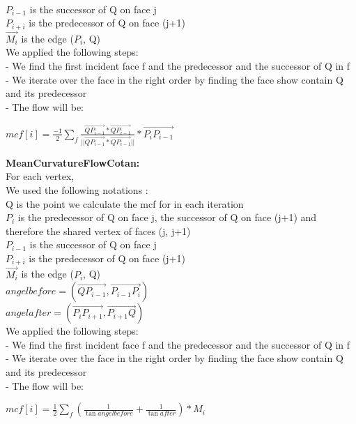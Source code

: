 \documentclass[12pt]{article}
\begin{document}
\\$P_{i-1}$ is the successor of Q on face j
\\$P_{i+i}$ is the predecessor of Q on face (j+1)
\\$\vec{M_i}$ is the edge ($P_i$, Q)
\\ We applied the following steps:
\\- We find the first incident face f and the predecessor and the successor of Q in f 
\\ - We iterate over the face in the right order by finding  the face show contain Q and its predecessor 
\\- The flow will be:
\begin{center}
$mcf[i]=\frac{-1}{2}\sum_{f}^{} \frac{\vec{QP_{i-1}} *\vec{QP_{i-1}}}{||\vec{QP_{i-1}} *\vec{QP_{i-1}}||} * \vec{P_iP_{i-1}} $
\end{center}
\textbf{MeanCurvatureFlowCotan:}
\\ For each vertex,
\\We used the following notations :
\\ Q is the point we calculate the mcf for in each iteration
\\$P_i$ is the predecessor of Q on face j, the successor of Q on face (j+1) and therefore the shared vertex of faces (j, j+1)
\\$P_{i-1}$ is the successor of Q on face j
\\$P_{i+i}$ is the predecessor of Q on face (j+1)
\\$\vec{M_i}$ is the edge ($P_i$, Q)
\\ $angelbefore = (\vec{QP_{i-1}},\vec{P_{i-1}P_{i}})$
\\ $angelafter = (\vec{P_iP_{i+1}},\vec{P_{i+1}Q})$
\\ We applied the following steps:
\\- We find the first incident face f and the predecessor and the successor of Q in f 
\\ - We iterate over the face in the right order by finding  the face show contain Q and its predecessor 
\\- The flow will be:
\begin{center}
$mcf[i]= \frac{1}{2}\sum_{f}^{} (\frac{1}{\tan angelbefore}+ \frac{1}{\tan after} ) * M_i$
\end{center}
\end{document}
